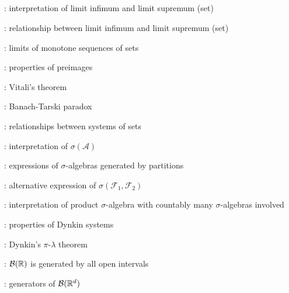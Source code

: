 \subsection*{}
\item {}: interpretation of limit infimum and limit supremum (set)
\item {}: relationship between limit infimum and limit supremum (set)
\item {}: limits of monotone sequences of sets
\item {}: properties of preimages
\item {}: Vitali's theorem
\item {}: Banach-Tarski paradox
\item {}: relationships between systems of sets
\item {}: interpretation of \(\sigma(\mathcal{A})\)
\item {}: expressions of \(\sigma\)-algebras generated by partitions
\item {}: alternative expression of \(\sigma(\mathcal{F}_1,\mathcal{F}_2)\)
\item {}: interpretation of product
\(\sigma\)-algebra with countably many \(\sigma\)-algebras involved
\item {}: properties of Dynkin systems
\item {}: Dynkin's \(\pi\)-\(\lambda\) theorem
\item {}: \(\mathcal{B}(\mathbb{R})\) is generated by all open intervals
\item {}: generators of \(\mathcal{B}(\mathbb{R}^d)\)
